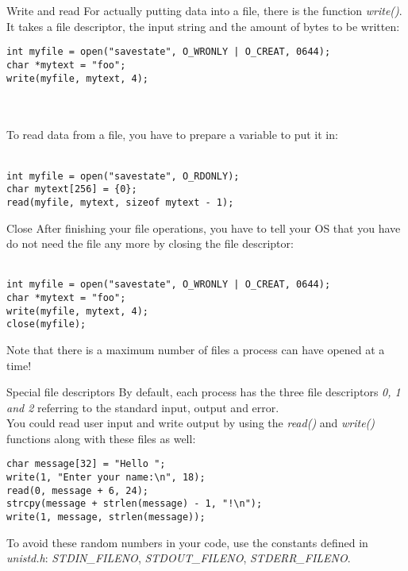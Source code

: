 \begin{frame}[fragile = singleslide]{Write and read}
	For actually putting data into a file, there is the function \textit{write()}.\\
	It takes a file descriptor, the input string and the amount of bytes to be written:\bigskip
	
	\begin{lstlisting}
int myfile = open("savestate", O_WRONLY | O_CREAT, 0644);
char *mytext = "foo";
write(myfile, mytext, 4);
\end{lstlisting}\ \\\ \\

	To read data from a file, you have to prepare a variable to put it in:\\\ \\
	
	\begin{lstlisting}
int myfile = open("savestate", O_RDONLY);
char mytext[256] = {0};
read(myfile, mytext, sizeof mytext - 1);
\end{lstlisting}
	
\end{frame}

\begin{frame}[fragile = singleslide]{Close}
	After finishing your file operations, you have to tell your OS that you have do not need the file any more by closing the file descriptor:\\\ \\
	
	\begin{lstlisting}
int myfile = open("savestate", O_WRONLY | O_CREAT, 0644);
char *mytext = "foo";
write(myfile, mytext, 4);
close(myfile);
\end{lstlisting}\bigskip
	Note that there is a maximum number of files a process can have opened at a time!
\end{frame}

\begin{frame}[fragile = singleslide]{Special file descriptors}
	By default, each process has the three file descriptors \textit{0, 1 and 2} referring to the standard input, output and error.\\
	You could read user input and write output by using the \textit{read()} and \textit{write()} functions along with these files as well:\bigskip
	\begin{lstlisting}
char message[32] = "Hello ";
write(1, "Enter your name:\n", 18);
read(0, message + 6, 24);
strcpy(message + strlen(message) - 1, "!\n");
write(1, message, strlen(message));
\end{lstlisting}\bigskip
	
	To avoid these random numbers in your code, use the constants defined in \textit{unistd.h}: \textit{STDIN\_FILENO}, \textit{STDOUT\_FILENO}, \textit{STDERR\_FILENO}.

\end{frame}

